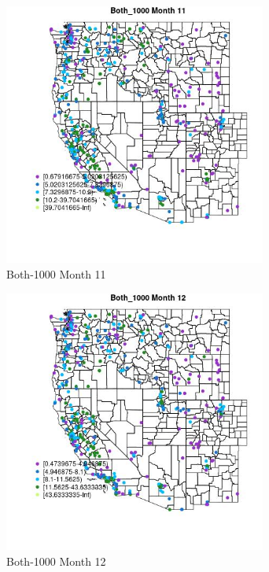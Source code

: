 \begin{figure} 
\centering  
\includegraphics[width=0.77\textwidth]{Code_Outputs/ML_input_report_ML_input_PM25_Step5_part_d_de_duplicated_aves_ML_input_MapObsMo11Both_1000.jpg} 
\caption{\label{fig:ML_input_report_ML_input_PM25_Step5_part_d_de_duplicated_aves_ML_inputMapObsMo11Both_1000}Both-1000 Month 11} 
\end{figure} 
 

\begin{figure} 
\centering  
\includegraphics[width=0.77\textwidth]{Code_Outputs/ML_input_report_ML_input_PM25_Step5_part_d_de_duplicated_aves_ML_input_MapObsMo12Both_1000.jpg} 
\caption{\label{fig:ML_input_report_ML_input_PM25_Step5_part_d_de_duplicated_aves_ML_inputMapObsMo12Both_1000}Both-1000 Month 12} 
\end{figure} 
 

